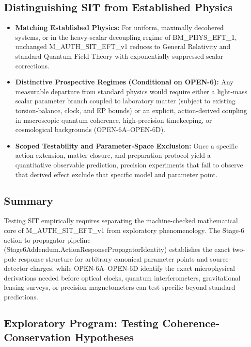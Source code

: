 \documentclass[american,11pt,letterpaper]{article}
\def\texttt#1{#1}%
\begin{document}
\subsection{Distinguishing SIT from Established Physics}

\begin{itemize}
    \item \textbf{Matching Established Physics:}  
    For uniform, maximally decohered systems, or in the heavy-scalar decoupling regime of \texttt{BM\_PHYS\_EFT\_1}, unchanged \texttt{M\_AUTH\_SIT\_EFT\_v1} reduces to General Relativity and standard Quantum Field Theory with exponentially suppressed scalar corrections.
    \item \textbf{Distinctive Prospective Regimes (Conditional on \texttt{OPEN-6}):}  
    Any measurable departure from standard physics would require either a light-mass scalar parameter branch coupled to laboratory matter (subject to existing torsion-balance, clock, and EP bounds) or an explicit, action-derived coupling in macroscopic quantum coherence, high-precision timekeeping, or cosmological backgrounds (\texttt{OPEN-6A}--\texttt{OPEN-6D}).
    \item \textbf{Scoped Testability and Parameter-Space Exclusion:}  
    Once a specific action extension, matter closure, and preparation protocol yield a quantitative observable prediction, precision experiments that fail to observe that derived effect exclude that specific model and parameter point.
\end{itemize}

\subsection{Summary}

Testing SIT empirically requires separating the machine-checked mathematical core of \texttt{M\_AUTH\_SIT\_EFT\_v1} from exploratory phenomenology. The Stage-6 action-to-propagator pipeline (\texttt{Stage6Addendum.\allowbreak{}ActionResponsePropagatorIdentity}) establishes the exact two-pole response structure for arbitrary canonical parameter points and source--detector charges, while \texttt{OPEN-6A}--\texttt{OPEN-6D} identify the exact microphysical derivations needed before optical clocks, quantum interferometers, gravitational lensing surveys, or precision magnetometers can test specific beyond-standard predictions.

\subsection{Exploratory Program: Testing Coherence-Conservation Hypotheses}
\label{sec:falsifiability_coherence_conservation}
\end{document}
